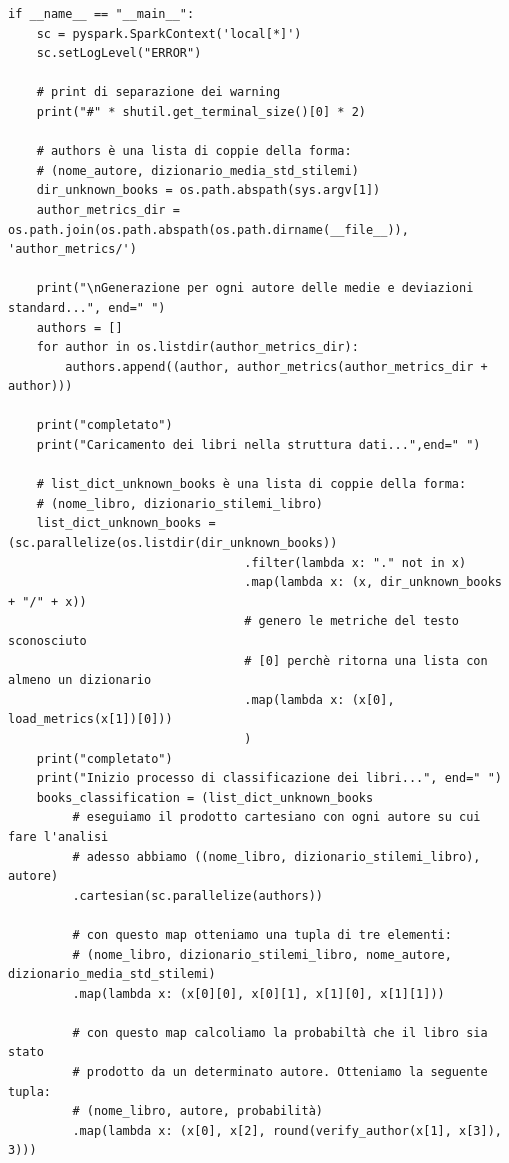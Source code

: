 \documentclass[titlepage]{article}
\begin{document}
\begin{verbatim}
if __name__ == "__main__":
    sc = pyspark.SparkContext('local[*]')
    sc.setLogLevel("ERROR")
    
    # print di separazione dei warning
    print("#" * shutil.get_terminal_size()[0] * 2)
    
    # authors è una lista di coppie della forma:
    # (nome_autore, dizionario_media_std_stilemi)
    dir_unknown_books = os.path.abspath(sys.argv[1])    
    author_metrics_dir = os.path.join(os.path.abspath(os.path.dirname(__file__)), 'author_metrics/')
    
    print("\nGenerazione per ogni autore delle medie e deviazioni standard...", end=" ")
    authors = []
    for author in os.listdir(author_metrics_dir):
        authors.append((author, author_metrics(author_metrics_dir + author)))
    
    print("completato")
    print("Caricamento dei libri nella struttura dati...",end=" ")
    
    # list_dict_unknown_books è una lista di coppie della forma:
    # (nome_libro, dizionario_stilemi_libro)
    list_dict_unknown_books =   (sc.parallelize(os.listdir(dir_unknown_books))
                                 .filter(lambda x: "." not in x)
                                 .map(lambda x: (x, dir_unknown_books + "/" + x))
                                 # genero le metriche del testo sconosciuto 
                                 # [0] perchè ritorna una lista con almeno un dizionario
                                 .map(lambda x: (x[0], load_metrics(x[1])[0]))
                                 )
    print("completato")
    print("Inizio processo di classificazione dei libri...", end=" ")
    books_classification = (list_dict_unknown_books
         # eseguiamo il prodotto cartesiano con ogni autore su cui fare l'analisi
         # adesso abbiamo ((nome_libro, dizionario_stilemi_libro), autore)
         .cartesian(sc.parallelize(authors))
         
         # con questo map otteniamo una tupla di tre elementi:
         # (nome_libro, dizionario_stilemi_libro, nome_autore, dizionario_media_std_stilemi)
         .map(lambda x: (x[0][0], x[0][1], x[1][0], x[1][1]))
         
         # con questo map calcoliamo la probabiltà che il libro sia stato
         # prodotto da un determinato autore. Otteniamo la seguente tupla:
         # (nome_libro, autore, probabilità)
         .map(lambda x: (x[0], x[2], round(verify_author(x[1], x[3]), 3)))
         

\end{verbatim}
\end{document}
